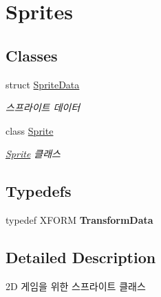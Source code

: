 \hypertarget{group___sprites}{}\section{Sprites}
\label{group___sprites}
\subsection*{Classes}
\begin{DoxyCompactItemize}
\item 
struct \mbox{\hyperlink{struct_sprite_data}{Sprite\+Data}}
\begin{DoxyCompactList}\small\item\em 스프라이트 데이터 \end{DoxyCompactList}\item 
class \mbox{\hyperlink{class_sprite}{Sprite}}
\begin{DoxyCompactList}\small\item\em \mbox{\hyperlink{class_sprite}{Sprite}} 클래스 \end{DoxyCompactList}\end{DoxyCompactItemize}
\subsection*{Typedefs}
\begin{DoxyCompactItemize}
\item 
\mbox{\label{group___sprites_ga2df993a691cf9c61997685cc92061622}} 
typedef X\+F\+O\+RM {\bfseries Transform\+Data}
\end{DoxyCompactItemize}


\subsection{Detailed Description}
2D 게임을 위한 스프라이트 클래스 
